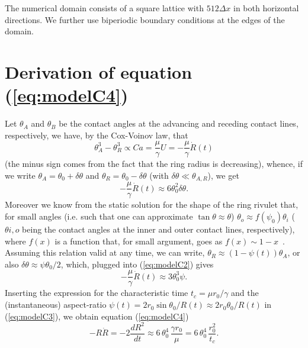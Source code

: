 \documentclass[twoside,twocolumn,9pt]{article}
\begin{document}
The numerical domain consists of a square lattice with $512\Delta x$ in both horizontal directions.
We further use biperiodic boundary conditions at the edges of the domain. 

\section{Derivation of equation (\ref{eq:modelC4})}\label{sec:derivation}
Let $\theta_A$ and $\theta_B$ be the contact angles at the advancing and receding contact lines, respectively, we have, by the Cox-Voinov law, that 
\begin{equation}\label{eq:modelCV}
\theta_A^3 - \theta_R^3 \propto Ca = \frac{\mu}{\gamma} U = - \frac{\mu}{\gamma} \dot{R}(t)
\end{equation}
(the minus sign comes from the fact that the ring radius is decreasing), whence, if we write 
$\theta_A = \theta_0 + \delta \theta$ and $\theta_R = \theta_0 - \delta \theta$ 
(with $\delta \theta \ll \theta_{A,R}$), we get
\begin{equation}\label{eq:modelC2}
- \frac{\mu}{\gamma} \dot{R}(t) \approx 6 \theta_0^2 \delta \theta.
\end{equation}
Moreover we know from the static solution for the shape of the ring rivulet that, for small angles (i.e. such that one can approximate $\tan \theta \approx \theta$) $\theta_o \approx f(\psi_0) \theta_i$ ($\theta{i,o}$ being the contact angles at the inner and outer contact lines, respectively), where $f(x)$ is a function that, for small argument, goes as $f(x) \sim 1-x$~\cite{gonzalezStabilityLiquidRing2013}.
Assuming this relation valid at any time, we can write, $\theta_R \approx (1-\psi(t))\theta_A$, or also $\delta \theta \approx \psi \theta_0/2$, which, plugged into (\ref{eq:modelC2}) gives
\begin{equation}\label{eq:modelC3}
- \frac{\mu}{\gamma} \dot{R}(t) \approx 3 \theta_0^3 \psi.
\end{equation}
Inserting the expression for the characteristic time $t_c = \mu r_0/\gamma$ and the (instantaneous) aspect-ratio $\psi(t) = 2r_0\sin \theta_0/R(t) \approx 2 r_0\theta_0/R(t)$ in (\ref{eq:modelC3}), 
we obtain equation (\ref{eq:modelC4})
\begin{equation}
-R\dot{R} = - 2\frac{d R^2}{d t} \approx 6 \, \theta_0^4 \, \frac{\gamma r_0}{\mu} = 6 \, \theta_0^4 \, \frac{r_0^2}{t_c}.
\end{equation}
\end{document}
